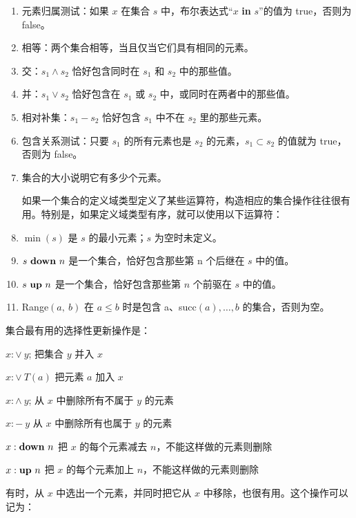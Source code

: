 \documentclass[twoside,11pt,fontset=none]{ctexbook}
\begin{document}
\begin{enumerate}[wide, nosep, label=(\arabic*)]
	\item 元素归属测试：如果 $x$ 在集合 $s$ 中，布尔表达式“$x$ \textbf{in} $s$”的值为 true，否则为 false。
	\item 相等：两个集合相等，当且仅当它们具有相同的元素。
	\item 交：$s_1 \wedge s_2$ 恰好包含同时在 $s_1$ 和 $s_2$ 中的那些值。
	\item 并：$s_1 \vee s_2$ 恰好包含在 $s_1$ 或 $s_2$ 中，或同时在两者中的那些值。
	\item 相对补集：$s_1 - s_2$ 恰好包含 $s_1$ 中不在 $s_2$ 里的那些元素。
	\item 包含关系测试：只要 $s_1$ 的所有元素也是 $s_2$ 的元素，$s_1 \subset s_2$ 的值就为 true，否则为 false。
	\item 集合的大小说明它有多少个元素。

	如果一个集合的定义域类型定义了某些运算符，构造相应的集合操作往往很有用。特别是，如果定义域类型有序，就可以使用以下运算符：

	\item $\min(s)$ 是 $s$ 的最小元素；$s$ 为空时未定义。
	\item $s \text{ \textbf{down} } n$ 是一个集合，恰好包含那些第 n 个后继在 $s$ 中的值。
	\item $s \text{ \textbf{up} } n$ 是一个集合，恰好包含那些第 $n$ 个前驱在 $s$ 中的值。
	\item Range$(a,\ b)$ 在 $a \leqslant b$ 时是包含 a、succ$(a), \dots, b$ 的集合，否则为空。
\end{enumerate}

集合最有用的选择性更新操作是：

\noindent
$x:\vee\ y$; \tabto*{5em} 把集合 $y$ 并入 $x$

\noindent
$x:\vee\ T(a)$ \tabto*{5em} 把元素 $a$ 加入 $x$

\noindent
$x:\wedge\ y$; \tabto*{5em} 从 $x$ 中删除所有不属于 $y$ 的元素

\noindent
$x:-\ y$ \tabto*{5em} 从 $x$ 中删除所有也属于 $y$ 的元素

\noindent
{}\parindent$x:\text{\textbf{down} }n$ \tabto*{5em} 把 $x$ 的每个元素减去 $n$，不能这样做的元素则删除

\noindent
{}\parindent$x:\text{\textbf{up} } n$ \tabto*{5em} 把 $x$ 的每个元素加上 $n$，不能这样做的元素则删除

\noindent
有时，从 $x$ 中选出一个元素，并同时把它从 $x$ 中移除，也很有用。这个操作可以记为：
\end{document}
